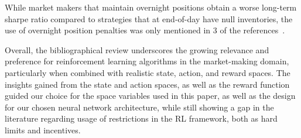 \begin{figure}[H]
    \centering
\end{figure}

While market makers that maintain overnight positions obtain a worse long-term sharpe ratio compared to strategies that at end-of-day have null inventories,
the use of overnight position penalties was only mentioned in 3 of the references~\cite{gasperov2021marketmaking}.

Overall, the bibliographical review underscores the growing relevance and preference for reinforcement learning algorithms in the market-making domain,
particularly when combined with realistic state, action, and reward spaces.
The insights gained from the state and action spaces, as well as the reward function guided our choice for the space variables used in this paper,
as well as the design for our chosen neural network architecture,
while still showing a gap in the literature regarding usage of restrictions in the RL framework, both as hard limits and incentives.
